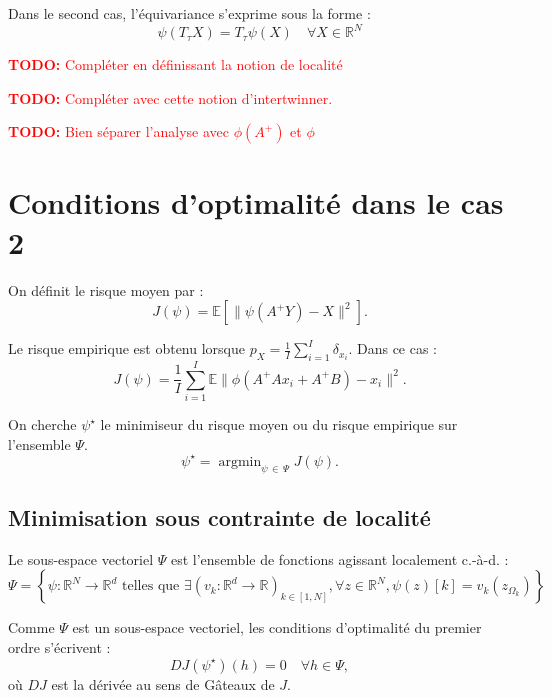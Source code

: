 \documentclass[a4paper,10pt]{article}
\theoremstyle{definition} %
\theoremstyle{definition} %
\theoremstyle{definition} %
\theoremstyle{definition} %
\newcommand{\R}{\mathbb{R}}
\newcommand{\argmin}{\mathop{\mathrm{argmin}}}
\newcommand{\todo}[1]{\textcolor{red}{\textbf{TODO:} #1}}
\begin{document}
Dans le second cas, l'équivariance s'exprime sous la forme :
\begin{equation}
    \psi(T_\tau X) = T_\tau \psi(X) \quad  \forall X\in \R^N
\end{equation}

\todo{Compléter en définissant la notion de localité}

\todo{Compléter avec cette notion d'intertwinner. }

\todo{Bien séparer l'analyse avec $\phi(A^+)$ et $\phi$}


\section{Conditions d'optimalité dans le cas 2}

On définit le risque moyen par :
\begin{equation}
    J(\psi) = \mathbb{E} \left[ \| \psi(A^{+}Y) - X \|^2 \right].
\end{equation}

Le risque empirique est obtenu lorsque $p_X= \frac{1}{I}\sum_{i=1}^I \delta_{x_i}$. Dans ce cas : 
\begin{equation}
    J(\psi) = \frac{1}{I}\sum_{i=1}^I  \mathbb{E} \| \phi(A^{+}Ax_i + A^+B) - x_i  \|^2.
\end{equation}

On cherche $\psi^\star$ le minimiseur du risque moyen ou du risque empirique sur l'ensemble $\Psi$.
\begin{equation*}
    \psi^\star = \argmin_{\psi\,\in\, \Psi} J(\psi).
\end{equation*}

\subsection{Minimisation sous contrainte de localité}

Le sous-espace vectoriel $\Psi$ est l'ensemble de fonctions agissant localement c.-à-d. :
\begin{equation*}
    \Psi = \left\{\psi : \mathbb{R}^N \to \mathbb{R}^d \text{ telles que } \exists (v_k : \mathbb{R}^d \to \mathbb{R})_{k \in [1, N]}, \forall z \in \mathbb{R}^N, \psi(z)[k] = v_k(z_{\Omega_k})\right\}
\end{equation*}


Comme $\Psi$ est un sous-espace vectoriel, les conditions d'optimalité du premier ordre s'écrivent :
\begin{equation}
    DJ(\psi^\star)(h) = 0 \quad \forall h \in \Psi,
\end{equation}
où $DJ$ est la dérivée au sens de Gâteaux de $J$.
\end{document}
